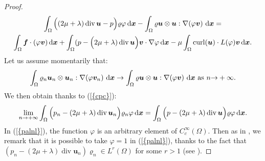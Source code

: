 \documentclass{amsart}
\numberwithin{equation}{section}
\begin{document}
\begin{proof}
\begin{multline*}
\int_{\Omega} \Big( (2\mu+\lambda)\operatorname{div} {\bm{u}}-p\Big) {\varrho} {\varphi}{\, {\rm d}{{\boldsymbol x}}} - \int_\Omega {\varrho}  {{\boldsymbol u}}  \otimes {{\boldsymbol u}}  : {{\nabla}} (\varphi {\bm{v}})  \, {\, {\rm d}{{\boldsymbol x}}}=  \\  \int_{\Omega} \bm{f} \cdot (\varphi {\bm{v}}){\, {\rm d}{{\boldsymbol x}}} + \int_{\Omega} (p- \Big(2\mu+\lambda)\operatorname{div} {\bm{u}} \Big) {\bm{v}} \cdot {{\nabla}} \varphi{\, {\rm d}{{\boldsymbol x}}} - \mu  \int_{\Omega} {{\rm curl}}({{\boldsymbol u}}) \cdot L(\varphi){\bm{v}}{\, {\rm d}{{\boldsymbol x}}}.
\end{multline*}
Let us assume momentarily that:
\begin{equation}
\int_{\Omega}    {\varrho}_n {{\boldsymbol u}}_n \otimes {{\boldsymbol u}}_n :  {{\nabla}} (\varphi {\bm{v}}_n) \, {\, {\rm d}{{\boldsymbol x}}}  \to \int_\Omega {\varrho}  {{\boldsymbol u}}  \otimes {{\boldsymbol u}}  : {{\nabla}} (\varphi {\bm{v}})  \, {\, {\rm d}{{\boldsymbol x}}} \mbox{ as } {{n {\rightarrow} + \infty}}.
\label{ass:kk}
\end{equation}
We then obtain thanks to  {(\ref{{cpc}})}:
\begin{equation}
\lim_{{n {\rightarrow} + \infty}} \int_{\Omega} \Big(p_n -(2\mu+\lambda) \operatorname{div} {\bm{u}}_n\Big) {\varrho}_n \varphi {\, {\rm d}{{\boldsymbol x}}}= \int_{\Omega} \Big(p -(2\mu+\lambda) \operatorname{div} {\bm{u}} \Big) {\varrho} \varphi{\, {\rm d}{{\boldsymbol x}}}.
\label{palnl}
\end{equation}
In {(\ref{{palnl}})}, the function ${\varphi}$ is an arbitrary element of $C^\infty_c(\Omega)$. 
Then as in \cite{eymard2010convergent}, we remark that it is possible to take ${\varphi}=1$ in {(\ref{{palnl}})}, thanks to the fact that $(p_n - (2\mu+\lambda)\operatorname{div} {\bm{u}}_n) {\varrho}_n \in L^r(\Omega)$ for some $r >1$ (see \cite[Lemma B.2]{eymard2010convergent}). 


\end{proof}
\end{document}

